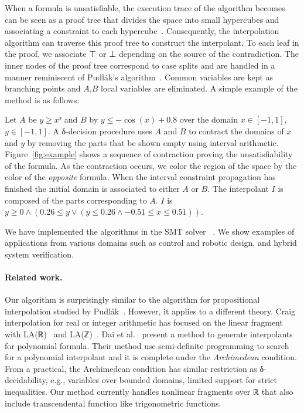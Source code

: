 When a formula is unsatisfiable, the execution trace of the algorithm becomes can be seen as a proof tree that divides the space into small hypercubes and associating a constraint to each hypercube~\cite{DBLP:conf/synasc/GaoKC14}. Consequently, the interpolation algorithm can traverse this proof tree to construct the interpolant. To each leaf in the proof, we associate ⊤ or ⊥ depending on the source of the contradiction. The inner nodes of the proof tree correspond to case splits and are handled in a manner reminiscent of Pudl{\'a}k's algorithm~\cite{MR1472134}. Common variables are kept as branching points and $A$,$B$ local variables are eliminated. A simple example of the method is as follows:

\begin{example}
Let $A$ be $y≥x²$ and $B$ by $y ≤ -\cos(x) + 0.8$ over the domain $x∈[-1,1]$, $y∈[-1,1]$.
A δ-decision procedure uses $A$ and $B$ to contract the domains of $x$ and $y$ by removing the parts that be shown empty using interval arithmetic.
Figure~\ref{fig:example} shows a sequence of contraction proving the unsatisfiability of the formula.
As the contraction occurs, we color the region of the space by the color of the \emph{opposite} formula.
When the interval constraint propagation has finished the initial domain is associated to either $A$ or $B$.
The interpolant $I$ is composed of the parts corresponding to $A$.
$I$ is $y ≥ 0 ∧ (0.26 ≤ y ∨ (y ≤ 0.26 ∧ -0.51 ≤ x ≤ 0.51))$.
\end{example}

We have implemented the algorithms in the SMT solver \dReal~\cite{DBLP:conf/cade/GaoKC13}. We show examples of applications from various domains such as control and robotic design, and hybrid system verification.  

\paragraph{Related work.}
Our algorithm is surprisingly similar to the algorithm for propositional interpolation studied by Pudl{\'a}k~\cite{MR1472134}.
However, it applies to a different theory.
Craig interpolation for real or integer arithmetic has focused on the linear fragment with LA(ℝ)~\cite{DBLP:conf/tacas/McMillan04,DBLP:conf/vmcai/RybalchenkoS07} and LA(ℤ)~\cite{DBLP:conf/cade/BrilloutKRW10,DBLP:conf/tacas/GriggioLS11}.
Dai et al.~\cite{DBLP:conf/cav/DaiXZ13} present a method to generate interpolants for polynomial formula.
Their method use semi-definite programming to search for a polynomial interpolant and it is complete under the \emph{Archimedean} condition.
From a practical, the Archimedean condition has similar restriction as δ-decidability, e.g., variables over bounded domains, limited support for strict inequalities.
Our method currently handles nonlinear fragments over ℝ that also include transcendental function like trigonometric functions.

